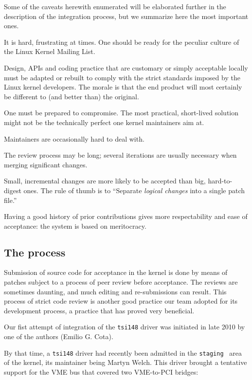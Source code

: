 \documentclass{JAC2003}
\begin{document}
Some of the caveats herewith enumerated will be elaborated further in
the description of the integration process, but we summarize here the most
important ones.

\begin{Itemize}
\item It is hard, frustrating at times. One should be ready for the
    peculiar culture of the Linux Kernel Mailing List.
\item Design, APIs and coding practice that are customary or simply
    acceptable locally must be adapted or rebuilt to comply with the strict
    standards imposed by the Linux kernel developers. The morale is that
    the end product will most certainly be different to (and better than)
    the original.
\item One must be prepared to compromise. The most practical,
    short-lived solution might not be the technically perfect one kernel
    maintainers aim at.
\item Maintainers are occasionally hard to deal with.
\item The review process may be long; several iterations are usually
    necessary when merging significant changes.
\item Small, incremental changes are more likely to be accepted than
    big, hard-to-digest ones. The rule of thumb is to ``Separate \emph{logical
    changes} into a single patch file.''~\cite{submitting-patches}
\item Having a good history of prior contributions gives more respectability
    and ease of acceptance: the system is based on meritocracy.
\end{Itemize}

\subsection{The process}

Submission of source code for acceptance in the kernel is done by means of
patches subject to a process of peer review before acceptance. The reviews
are sometimes daunting, and much editing and re-submissions can result. This
process of strict code review is another good practice our team adopted for
its development process, a practice that has proved very beneficial.

Our fist attempt of integration of the \verb|tsi148| driver was initiated
in late 2010 by one of the authors (Emilio G. Cota).

By that time, a \verb|tsi148| driver had recently been admitted in
the \texttt{staging}~\cite{staging} area of the kernel, its maintainer being
Martyn Welch. This driver brought a tentative support for the VME bus that
covered two VME-to-PCI bridges:
\end{document}
